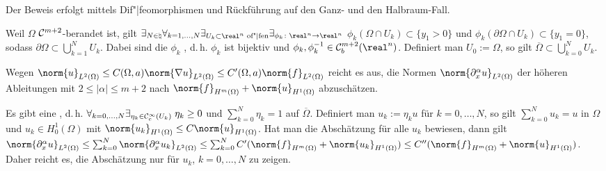 \begin{Bem}
    Der Beweis erfolgt mittels Dif"|feomorphismen und Rückführung auf den Ganz- und den
    Halbraum-Fall.

    Weil $\Omega$ $\mathcal{C}^{m+2}$-berandet ist, gilt
    $\exists_{N \in \natural} \forall_{k = 1, \dotsc, N}
    \exists_{U_k \subset \real^n \text{ of"|fen}}
    \exists_{\phi_k\colon \real^n \rightarrow \real^n}$
    $\phi_k(\Omega \cap U_k) \subset \{y_1 > 0\}$ und
    $\phi_k(\partial\Omega \cap U_k) \subset \{y_1 = 0\}$, sodass
    $\partial\Omega \subset \bigcup_{k=1}^N U_k$.
    Dabei sind die $\phi_k$ , d.\,h.
    $\phi_k$ ist bijektiv und $\phi_k, \phi_k^{-1} \in \C^{m+2}_b(\real^n)$.
    Definiert man $U_0 := \Omega$, so gilt $\overline{\Omega} \subset \bigcup_{k=0}^N U_k$.

    Wegen $\norm{u}_{L^2(\Omega)} \le C(\Omega, a) \norm{\nabla u}_{L^2(\Omega)} \le
    C'(\Omega, a) \norm{f}_{L^2(\Omega)}$ reicht es aus, die Normen
    $\norm{\partial_x^\alpha u}_{L^2(\Omega)}$ der höheren Ableitungen mit
    $2 \le |\alpha| \le m + 2$ nach $\norm{f}_{H^m(\Omega)} + \norm{u}_{H^1(\Omega)}$
    abzuschätzen.

    Es gibt eine , d.\,h.
    $\forall_{k=0,\dotsc,N} \exists_{\eta_k \in \mathcal{C}^\infty_c(U_k)}\;
    \eta_k \ge 0$ und $\sum_{k=0}^N \eta_k = 1$ auf $\overline{\Omega}$.
    Definiert man $u_k := \eta_k u$ für $k = 0, \dotsc, N$, so gilt
    $\sum_{k=0}^N u_k = u$ in $\Omega$ und $u_k \in H^1_0(\Omega)$ mit
    $\norm{u_k}_{H^1(\Omega)} \le C \norm{u}_{H^1(\Omega)}$.
    Hat man die Abschätzung für alle $u_k$ bewiesen, dann gilt\\
    $\norm{\partial_x^\alpha u}_{L^2(\Omega)}
    \le \sum_{k=0}^N \norm{\partial_x^\alpha u_k}_{L^2(\Omega)}
    \le \sum_{k=0}^N C' (\norm{f}_{H^m(\Omega)} + \norm{u_k}_{H^1(\Omega)})
    \le C'' (\norm{f}_{H^m(\Omega)} + \norm{u}_{H^1(\Omega)})$.
    Daher reicht es, die Abschätzung nur für $u_k$, $k = 0, \dotsc, N$ zu zeigen.
%
\end{Bem}

